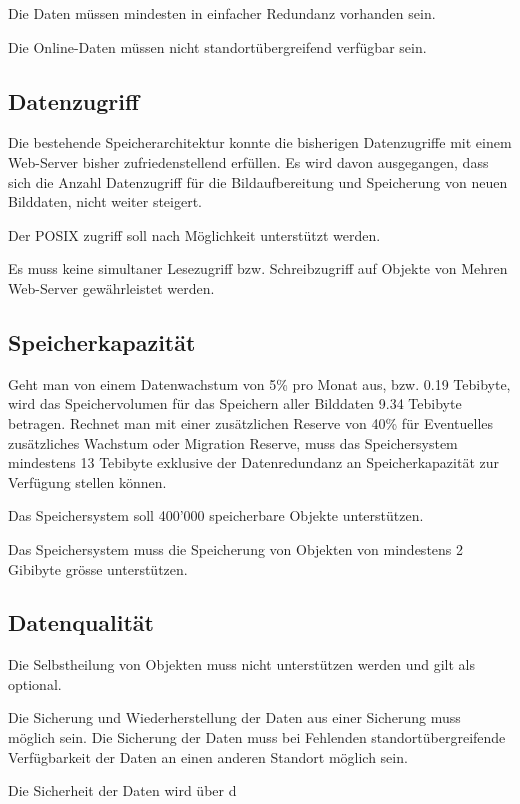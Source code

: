Die Daten müssen mindesten in einfacher Redundanz vorhanden sein. 

Die Online-Daten müssen nicht standortübergreifend verfügbar sein.

\subsection{Datenzugriff}
Die bestehende Speicherarchitektur konnte die bisherigen Datenzugriffe mit einem Web-Server bisher zufriedenstellend erfüllen. Es wird davon ausgegangen, dass sich die Anzahl Datenzugriff für die Bildaufbereitung und Speicherung von neuen Bilddaten, nicht weiter steigert.

Der \gls{POSIX} zugriff soll nach Möglichkeit unterstützt werden.

Es muss keine simultaner Lesezugriff bzw. Schreibzugriff auf Objekte von Mehren Web-Server gewährleistet werden.

\subsection{Speicherkapazität}
Geht man von einem Datenwachstum von 5\% pro Monat aus, bzw. 0.19 Tebibyte, wird das Speichervolumen für das Speichern aller Bilddaten 9.34 Tebibyte betragen. Rechnet man mit einer zusätzlichen Reserve von 40\% für Eventuelles zusätzliches Wachstum oder Migration Reserve, muss das Speichersystem mindestens 13 Tebibyte exklusive der Datenredundanz an Speicherkapazität zur Verfügung stellen können.

Das Speichersystem soll 400'000 speicherbare Objekte unterstützen.

Das Speichersystem muss die Speicherung von Objekten von mindestens 2 Gibibyte grösse unterstützen.

\subsection{Datenqualität}

Die Selbstheilung von Objekten muss nicht unterstützen werden und gilt als optional.

Die Sicherung und Wiederherstellung der Daten aus einer Sicherung muss möglich sein. Die Sicherung der Daten muss bei Fehlenden standortübergreifende Verfügbarkeit der Daten an einen anderen Standort möglich sein.

Die Sicherheit der Daten wird über d



